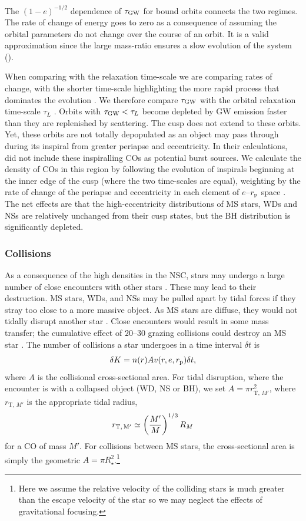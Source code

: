 The $(1-e)^{-1/2}$ dependence of $\tau_\mathrm{GW}$ for bound orbits connects the two regimes. The rate of change of energy goes to zero as a consequence of assuming the orbital parameters do not change over the course of an orbit. It is a valid approximation since the large mass-ratio ensures a slow evolution of the system ().

When comparing with the relaxation time-scale we are comparing rates of change, with the shorter time-scale highlighting the more rapid process that dominates the evolution \citep{Amaro-Seoane2007}. We therefore compare $\tau_\mathrm{GW}$ with the orbital relaxation time-scale $\tau_L$ \citep{Merritt2011}. Orbits with $\tau_\mathrm{GW} < \tau_L$ become depleted by GW emission faster than they are replenished by scattering. The cusp does not extend to these orbits. Yet, these orbits are not totally depopulated as an object may pass through during its inspiral from greater periapse and eccentricity. In their calculations, \citet{Hopman2007} did not include these inspiralling COs as potential burst sources. We calculate the density of COs in this region by following the evolution of inspirals beginning at the inner edge of the cusp (where the two time-scales are equal), weighting by the rate of change of the periapse and eccentricity in each element of $e$--$r_\mathrm{p}$ space \citep{Peters1964}. The net effects are that the high-eccentricity distributions of MS stars, WDs and NSs are relatively unchanged from their cusp states, but the BH distribution is significantly depleted.

\subsubsection{Collisions}\label{sec:Collision}

As a consequence of the high densities in the NSC, stars may undergo a large number of close encounters with other stars \citep{Cohn1978}. These may lead to their destruction. MS stars, WDs, and NSs may be pulled apart by tidal forces if they stray too close to a more massive object. As MS stars are diffuse, they would not tidally disrupt another star \citep{Murphy1991,Freitag2005}. Close encounters would result in some mass transfer; the cumulative effect of $20$--$30$ grazing collisions could destroy an MS star \citep{Freitag2006}. The number of collisions a star undergoes in a time interval $\delta t$ is
\begin{equation}
\delta K = n(r) A v(r,e,r_\mathrm{p})\delta t,
\end{equation}
where $A$ is the collisional cross-sectional area. For tidal disruption, where the encounter is with a collapsed object (WD, NS or BH), we set $A = \pi r_{\mathrm{T},\,{M'}}^2$, where $r_{\mathrm{T},\,{M'}}$ is the appropriate tidal radius,
\begin{equation}
r_\mathrm{T,\,{M'}} \simeq \left(\dfrac{M'}{M}\right)^{1/3}R_M
\end{equation}
for a CO of mass $M'$. For collisions between MS stars, the cross-sectional area is simply the geometric $A = \pi R_\star^2$.\footnote{Here we assume the relative velocity of the colliding stars is much greater than the escape velocity of the star so we may neglect the effects of gravitational focusing.}

